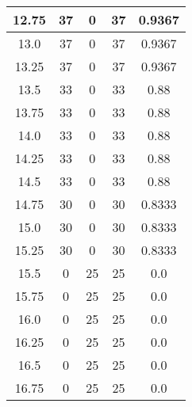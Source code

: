 \documentclass[letterpaper, 12pt]{article}
\begin{document}
\begin{longtable}{|c|c|c|c|c|}
\hline
12.75 & 37 & 0 & 37 & 0.9367 \\
\hline
13.0 & 37 & 0 & 37 & 0.9367 \\
\hline
13.25 & 37 & 0 & 37 & 0.9367 \\
\hline
13.5 & 33 & 0 & 33 & 0.88 \\
\hline
13.75 & 33 & 0 & 33 & 0.88 \\
\hline
14.0 & 33 & 0 & 33 & 0.88 \\
\hline
14.25 & 33 & 0 & 33 & 0.88 \\
\hline
14.5 & 33 & 0 & 33 & 0.88 \\
\hline
14.75 & 30 & 0 & 30 & 0.8333 \\
\hline
15.0 & 30 & 0 & 30 & 0.8333 \\
\hline
15.25 & 30 & 0 & 30 & 0.8333 \\
\hline
15.5 & 0 & 25 & 25 & 0.0 \\
\hline
15.75 & 0 & 25 & 25 & 0.0 \\
\hline
16.0 & 0 & 25 & 25 & 0.0 \\
\hline
16.25 & 0 & 25 & 25 & 0.0 \\
\hline
16.5 & 0 & 25 & 25 & 0.0 \\
\hline
16.75 & 0 & 25 & 25 & 0.0 \\
\hline
\end{longtable}
\end{document}
